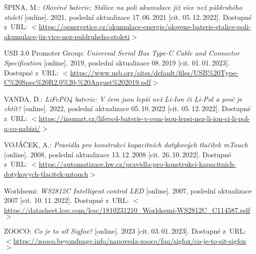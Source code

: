 \begin{thebibliography}{99}
    ŠPINA, M.:
    \emph{Olověné baterie: Stálice na poli akumulace již více než půldruhého století}\/ [online].
    2021, poslední aktualizace 17.\,06.\,2021 [cit. 05.\,12.\,2022].
    Dostupné z~URL:
    \(<\)\url{https://oenergetice.cz/akumulace-energie/olovene-baterie-stalice-poli-akumulace-jiz-vice-nez-puldruheho-stoleti}\(>\)

    USB 3.0 Promoter Group:
    \emph{Universal Serial Bus Type-C Cable and Connector Specification}\/ [online].
    2019, poslední aktualizace 08.\,2019 [cit. 01.\,01.\,2023]. 
    Dostupné z~URL:
    \(<\)\url{https://www.usb.org/sites/default/files/USB%20Type-C%20Spec%20R2.0%20-%20August%202019.pdf}\(>\)

    VANDA, D.:
    \emph{LiFePO4 baterie: V čem jsou lepší než Li-Ion či Li-Pol a proč je chtít?}\/ [online].
    2022, poslední aktualizace 05.\,10.\,2022 [cit. 05.\,12.\,2022].
    Dostupné z~URL:
    \(<\)\url{https://insmart.cz/lifepo4-baterie-v-cem-jsou-lepsi-nez-li-ion-ci-li-pol-a-co-nabizi/}\(>\)

    VOJÁČEK, A.:
    \emph{Pravidla pro konstrukci kapacitních dotykových tlačítek mTouch}\/ [online].
    2008, poslední aktualizace 13.\,12.\,2008 [cit. 26.\,10.\,2022].
    Dostupné z~URL:
    \(<\)\url{https://automatizace.hw.cz/pravidla-pro-konstrukci-kapacitnich-dotykovych-tlacitek-mtouch}\(>\)

    Worldsemi:
    \emph{WS2812C Intelligent control LED}\/ [online].
    2007, poslední aktualizace 2007 [cit. 10.\,11.\,2022].
    Dostupné z~URL: 
    \(<\)\url{https://datasheet.lcsc.com/lcsc/1810231210_Worldsemi-WS2812C_C114587.pdf}\(>\)

    ZOOCO:
    \emph{Co je to síť Sigfox?}\/ [online].
    2023 [cit. 03.\,01.\,2023].
    Dostupné z~URL: 
    \(<\)\url{https://zooco.beyondpage.info/napoveda-zooco/faq/sigfox/co-je-to-sit-sigfox}\(>\)

\end{thebibliography}


%
%
%
